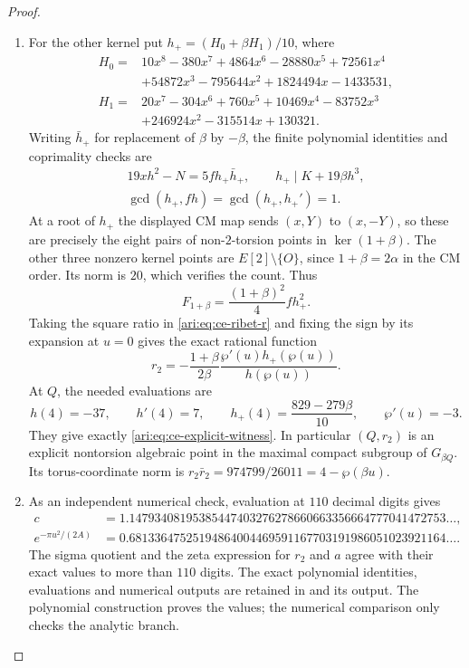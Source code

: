 \begin{proof}
\begin{enumerate}[label=\arabic*.,leftmargin=*]
\item For the other kernel put $h_+=(H_0+\beta H_1)/10$, where
\[
 \begin{aligned}
 H_0={}&10x^8-380x^7+4864x^6-28880x^5+72561x^4\\
       &+54872x^3-795644x^2+1824494x-1433531,\\
 H_1={}&20x^7-304x^6+760x^5+10469x^4-83752x^3\\
       &+246924x^2-315514x+130321.
 \end{aligned}
\]
Writing $\bar h_+$ for replacement of $\beta$ by $-\beta$,
the finite polynomial identities and coprimality checks are
\[
 \begin{gathered}
 19xh^2-N=5f h_+\bar h_+,\qquad
 h_+\mid K+19\beta h^3,\\
 \gcd(h_+,fh)=\gcd(h_+,h_+')=1.
 \end{gathered}
\]
At a root of $h_+$ the displayed CM map sends $(x,Y)$ to
$(x,-Y)$, so these are precisely the eight pairs of
non-$2$-torsion points in $\ker(1+\beta)$. The other three
nonzero kernel points are $E[2]\setminus\{O\}$, since
$1+\beta=2\alpha$ in the CM order. Its norm is $20$,
which verifies the count. Thus
\[
 F_{1+\beta}=\frac{(1+\beta)^2}{4}f h_+^2.
\]
Taking the square ratio in \eqref{ari:eq:ce-ribet-r} and fixing
the sign by its expansion at $u=0$ gives the exact rational
function
\[
 r_2=-\frac{1+\beta}{2\beta}\frac{\wp'(u)h_+(\wp(u))}
                                             {h(\wp(u))}.
\]
At $Q$, the needed evaluations are
\[
 h(4)=-37,\qquad h'(4)=7,\qquad
 h_+(4)=\frac{829-279\beta}{10},\qquad\wp'(u)=-3.
\]
They give exactly \eqref{ari:eq:ce-explicit-witness}. In
particular $(Q,r_2)$ is an explicit nontorsion algebraic
point in the maximal compact subgroup of $G_{\beta Q}$.
Its torus-coordinate norm is
$r_2\bar r_2=974799/26011=4-\wp(\beta u)$.

\item As an independent numerical check, evaluation at $110$
decimal digits gives
\[
 \begin{aligned}
 c&=1.14793408195385447403276278660663356664777041472753\ldots,\\
 e^{-\pi u^2/(2A)}
  &=0.68133647525194864004469591167703191986051023921164\ldots.
 \end{aligned}
\]
The sigma quotient and the zeta expression for $r_2$ and $a$
agree with their exact values to more than $110$ digits.
The exact polynomial identities, evaluations and numerical
outputs are retained in  and
its output. The polynomial construction proves the values;
the numerical comparison only checks the analytic branch.
\end{enumerate}
\end{proof}

